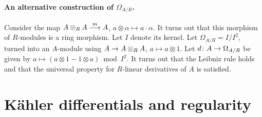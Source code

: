 \documentclass[a4paper,parskip=half,numbers=enddot, DIV=12, headheight=30pt]{scrreprt}
\begin{document}
\paragraph{An alternative construction of $\Omega_{A/R}$.} Consider the map $A\otimes_R A\morphism[m] A$, $a\otimes \alpha \mapsto a\cdot \alpha$. It turns out that this morphism of $R$-modules is a ring morphism. Let $I$ denote its kernel. Let $\Omega_{A/R} = I/I^2$, turned into an $A$-module using $A\morphism A\otimes_R A$, $a\mapsto a\otimes 1$. Let $d\colon A\morphism\Omega_{A/R}$ be given by $a\mapsto (a\otimes 1-1\otimes a)\bmod I^2$. It turns out that the Leibniz rule holds and that the universal property for $R$-linear derivatives of $A$ is satisfied.



\section{Kähler differentials and regularity}
\end{document}
